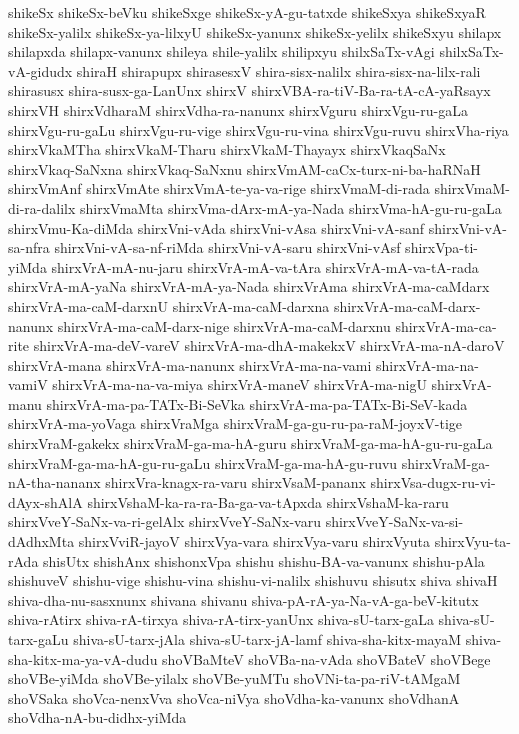 {shikeSx
shikeSx-beVku
shikeSxge
shikeSx-yA-gu-tatxde
shikeSxya
shikeSxyaR
shikeSx-yalilx
shikeSx-ya-lilxyU
shikeSx-yanunx
shikeSx-yelilx
shikeSxyu
shilapx
shilapxda
shilapx-vanunx
shileya
shile-yalilx
shilipxyu
shilxSaTx-vAgi
shilxSaTx-vA-gidudx
shiraH
shirapupx
shirasesxV
shira-sisx-nalilx
shira-sisx-na-lilx-rali
shirasusx
shira-susx-ga-LanUnx
shirxV
shirxVBA-ra-tiV-Ba-ra-tA-cA-yaRsayx
shirxVH
shirxVdharaM
shirxVdha-ra-nanunx
shirxVguru
shirxVgu-ru-gaLa
shirxVgu-ru-gaLu
shirxVgu-ru-vige
shirxVgu-ru-vina
shirxVgu-ruvu
shirxVha-riya
shirxVkaMTha
shirxVkaM-Tharu
shirxVkaM-Thayayx
shirxVkaqSaNx
shirxVkaq-SaNxna
shirxVkaq-SaNxnu
shirxVmAM-caCx-turx-ni-ba-haRNaH
shirxVmAnf
shirxVmAte
shirxVmA-te-ya-va-rige
shirxVmaM-di-rada
shirxVmaM-di-ra-dalilx
shirxVmaMta
shirxVma-dArx-mA-ya-Nada
shirxVma-hA-gu-ru-gaLa
shirxVmu-Ka-diMda
shirxVni-vAda
shirxVni-vAsa
shirxVni-vA-sanf
shirxVni-vA-sa-nfra
shirxVni-vA-sa-nf-riMda
shirxVni-vA-saru
shirxVni-vAsf
shirxVpa-ti-yiMda
shirxVrA-mA-nu-jaru
shirxVrA-mA-va-tAra
shirxVrA-mA-va-tA-rada
shirxVrA-mA-yaNa
shirxVrA-mA-ya-Nada
shirxVrAma
shirxVrA-ma-caMdarx
shirxVrA-ma-caM-darxnU
shirxVrA-ma-caM-darxna
shirxVrA-ma-caM-darx-nanunx
shirxVrA-ma-caM-darx-nige
shirxVrA-ma-caM-darxnu
shirxVrA-ma-ca-rite
shirxVrA-ma-deV-vareV
shirxVrA-ma-dhA-makekxV
shirxVrA-ma-nA-daroV
shirxVrA-mana
shirxVrA-ma-nanunx
shirxVrA-ma-na-vami
shirxVrA-ma-na-vamiV
shirxVrA-ma-na-va-miya
shirxVrA-maneV
shirxVrA-ma-nigU
shirxVrA-manu
shirxVrA-ma-pa-TATx-Bi-SeVka
shirxVrA-ma-pa-TATx-Bi-SeV-kada
shirxVrA-ma-yoVaga
shirxVraMga
shirxVraM-ga-gu-ru-pa-raM-joyxV-tige
shirxVraM-gakekx
shirxVraM-ga-ma-hA-guru
shirxVraM-ga-ma-hA-gu-ru-gaLa
shirxVraM-ga-ma-hA-gu-ru-gaLu
shirxVraM-ga-ma-hA-gu-ruvu
shirxVraM-ga-nA-tha-nananx
shirxVra-knagx-ra-varu
shirxVsaM-pananx
shirxVsa-dugx-ru-vi-dAyx-shAlA
shirxVshaM-ka-ra-ra-Ba-ga-va-tApxda
shirxVshaM-ka-raru
shirxVveY-SaNx-va-ri-gelAlx
shirxVveY-SaNx-varu
shirxVveY-SaNx-va-si-dAdhxMta
shirxVviR-jayoV
shirxVya-vara
shirxVya-varu
shirxVyuta
shirxVyu-ta-rAda
shisUtx
shishAnx
shishonxVpa
shishu
shishu-BA-va-vanunx
shishu-pAla
shishuveV
shishu-vige
shishu-vina
shishu-vi-nalilx
shishuvu
shisutx
shiva
shivaH
shiva-dha-nu-sasxnunx
shivana
shivanu
shiva-pA-rA-ya-Na-vA-ga-beV-kitutx
shiva-rAtirx
shiva-rA-tirxya
shiva-rA-tirx-yanUnx
shiva-sU-tarx-gaLa
shiva-sU-tarx-gaLu
shiva-sU-tarx-jAla
shiva-sU-tarx-jA-lamf
shiva-sha-kitx-mayaM
shiva-sha-kitx-ma-ya-vA-dudu
shoVBaMteV
shoVBa-na-vAda
shoVBateV
shoVBege
shoVBe-yiMda
shoVBe-yilalx
shoVBe-yuMTu
shoVNi-ta-pa-riV-tAMgaM
shoVSaka
shoVca-nenxVva
shoVca-niVya
shoVdha-ka-vanunx
shoVdhanA
shoVdha-nA-bu-didhx-yiMda
}

